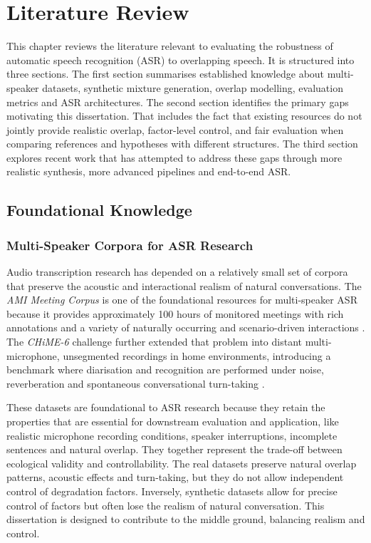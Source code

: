 \chapter{Literature Review}
\label{chap:literature_review}
This chapter reviews the literature relevant to evaluating the robustness of automatic speech recognition (ASR) to overlapping speech. It is structured into three sections. The first section summarises established knowledge about multi-speaker datasets, synthetic mixture generation, overlap modelling, evaluation metrics and ASR architectures. The second section identifies the primary gaps motivating this dissertation. That includes the fact that existing resources do not jointly provide realistic overlap, factor-level control, and fair evaluation when comparing references and hypotheses with different structures. The third section explores recent work that has attempted to address these gaps through more realistic synthesis, more advanced pipelines and end-to-end ASR.

\section{Foundational Knowledge}
\subsection{Multi-Speaker Corpora for ASR Research}
Audio transcription research has depended on a relatively small set of corpora that preserve the acoustic and interactional realism of natural conversations. The \textit{AMI Meeting Corpus} is one of the foundational resources for multi-speaker ASR because it provides approximately 100 hours of monitored meetings with rich annotations and a variety of naturally occurring and scenario-driven interactions \cite{carletta2005ami}. The \textit{CHiME-6} challenge further extended that problem into distant multi-microphone, unsegmented recordings in home environments, introducing a benchmark where diarisation and recognition are performed under noise, reverberation and spontaneous conversational turn-taking \cite{watanabe2020chime6challengetacklingmultispeakerspeech}.

These datasets are foundational to ASR research because they retain the properties that are essential for downstream evaluation and application, like realistic microphone recording conditions, speaker interruptions, incomplete sentences and natural overlap. They together represent the trade-off between ecological validity and controllability. The real datasets preserve natural overlap patterns, acoustic effects and turn-taking, but they do not allow independent control of degradation factors. Inversely, synthetic datasets allow for precise control of factors but often lose the realism of natural conversation. This dissertation is designed to contribute to the middle ground, balancing realism and control.

